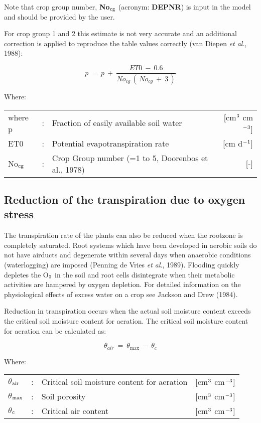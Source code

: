 Note that crop group number, {\bf No$_{{\rm cg}}$} (acronym: {\bf DEPNR}) is input in the model and should
be provided by the user.

For crop group 1 and 2 this estimate is not very accurate and an additional correction is
applied to reproduce the table values correctly (van Diepen {\it et al\/}., 1988):

\begin{equation}
p~=~p~+~{\frac{ET0 ~-~ 0.6}{No _{cg} \, (\, No _{cg} ~+~3\, )}}
\end{equation}

Where:\\[5pt]
\begin{tabularx}{\textwidth}{llXr}
where p &:& Fraction of easily available soil water  & [cm$^{{\rm 3}}$ cm$^{{\rm -3}}$]\\
ET0 &:& Potential evapotranspiration rate  & [cm d$^{{\rm -1}}$]\\
No$_{{\rm cg}}$ &:& Crop Group number {\small (=1 to 5, Doorenbos et al., 1978)}  & [-]\\
\end{tabularx}

\subsection{Reduction of the transpiration due to oxygen stress}
The transpiration rate of the plants can also be reduced when the rootzone is completely
saturated. Root systems which have been developed in aerobic soils do not have airducts
and degenerate within several days when anaerobic conditions (waterlogging) are imposed
(Penning de Vries {\it et al\/}., 1989). Flooding quickly depletes the O$_{{\rm 2}}$ in the soil and root cells
disintegrate when their metabolic activities are hampered by oxygen depletion. For
detailed information on the physiological effects of excess water on a crop see Jackson
and Drew (1984).

Reduction in transpiration occurs when the actual soil moisture content exceeds the
critical soil moisture content for aeration. The critical soil moisture content for aeration
can be calculated as:

\begin{equation}
\theta_{air} ~=~ \theta_{\max} ~-~\theta_{c} 
\end{equation}

Where:\\[5pt]
\begin{tabularx}{\textwidth}{llXr}
$\theta$$_{{\rm air}}$ &:& Critical soil moisture content for aeration & [cm$^{{\rm 3}}$ cm$^{{\rm -3}}$]\\
$\theta$$_{{\rm max}}$ &:& Soil porosity & [cm$^{{\rm 3}}$ cm$^{{\rm -3}}$]\\
$\theta$$_{{\rm c}}$ &:& Critical air content & [cm$^{{\rm 3}}$ cm$^{{\rm -3}}$]\\
\end{tabularx}

